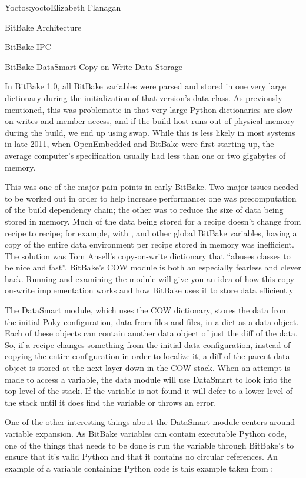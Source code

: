 \begin{aosachapter}{Yocto}{s:yocto}{Elizabeth Flanagan}
\begin{aosasect1}{BitBake Architecture}
\begin{aosasect2}{BitBake IPC}
\end{aosasect2}

\begin{aosasect2}{BitBake DataSmart Copy-on-Write Data Storage}

In BitBake 1.0, all BitBake variables were parsed and stored in one
very large dictionary during the initialization of that version's data
class. As previously mentioned, this was problematic in that very
large Python dictionaries are slow on writes and member access, and if
the build host runs out of physical memory during the build, we end up
using swap. While this is less likely in most systems in late 2011,
when OpenEmbedded and BitBake were first starting up, the average
computer's specification usually had less than one or two
gigabytes of memory.

This was one of the major pain points in early BitBake. Two major
issues needed to be worked out in order to help increase performance:
one was precomputation of the build dependency chain; the other was to
reduce the size of data being stored in memory. Much of the data
being stored for a recipe doesn't change from recipe to recipe; for
example, with ,  and other global BitBake
variables, having a copy of the entire data environment per recipe
stored in memory was inefficient. The solution was Tom Ansell's
copy-on-write dictionary that ``abuses classes to be nice and fast''.
BitBake's COW module is both an especially fearless and clever hack.
Running  and examining the module will
give you an idea of how this copy-on-write implementation works and
how BitBake uses it to store data efficiently

The DataSmart module, which uses the COW dictionary, stores the
data from the initial Poky configuration, data from  files and
 files, in a dict as a data object. Each of these objects can
contain another data object of just the diff of the data. So, if a
recipe changes something from the initial data configuration, instead
of copying the entire configuration in order to localize it, a diff of
the parent data object is stored at the next layer down in the
COW stack. When an attempt is made to access a variable, the data
module will use DataSmart to look into the top level of the stack. If
the variable is not found it will defer to a lower level of the stack
until it does find the variable or throws an error.

One of the other interesting things about the DataSmart module centers
around variable expansion. As BitBake variables can contain executable
Python code, one of the things that needs to be done is run the variable 
through BitBake's  to ensure that it's valid
Python and that it contains no circular references.  An example of a
variable containing Python code is this example taken from
:


\end{aosasect2}
\end{aosasect1}
\end{aosachapter}
